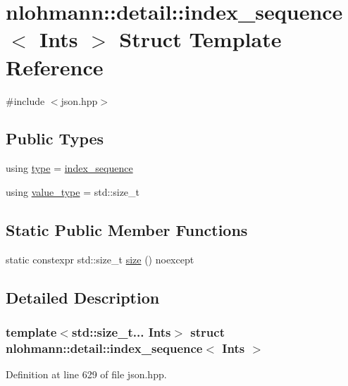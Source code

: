\hypertarget{structnlohmann_1_1detail_1_1index__sequence}{}\section{nlohmann\+::detail\+::index\+\_\+sequence$<$ Ints $>$ Struct Template Reference}
\label{structnlohmann_1_1detail_1_1index__sequence}


{\ttfamily \#include $<$json.\+hpp$>$}

\subsection*{Public Types}
\begin{DoxyCompactItemize}
\item 
using \mbox{\hyperlink{structnlohmann_1_1detail_1_1index__sequence_a3c14c4ab277de72b166806193ff4fa10}{type}} = \mbox{\hyperlink{structnlohmann_1_1detail_1_1index__sequence}{index\+\_\+sequence}}
\item 
using \mbox{\hyperlink{structnlohmann_1_1detail_1_1index__sequence_a2eca43d08fc1eb68bd5fa75b6714d21d}{value\+\_\+type}} = std\+::size\+\_\+t
\end{DoxyCompactItemize}
\subsection*{Static Public Member Functions}
\begin{DoxyCompactItemize}
\item 
static constexpr std\+::size\+\_\+t \mbox{\hyperlink{structnlohmann_1_1detail_1_1index__sequence_a7ac529419787d775f52408135304b337}{size}} () noexcept
\end{DoxyCompactItemize}


\subsection{Detailed Description}
\subsubsection*{template$<$std\+::size\+\_\+t... Ints$>$\newline
struct nlohmann\+::detail\+::index\+\_\+sequence$<$ Ints $>$}



Definition at line 629 of file json.\+hpp.



